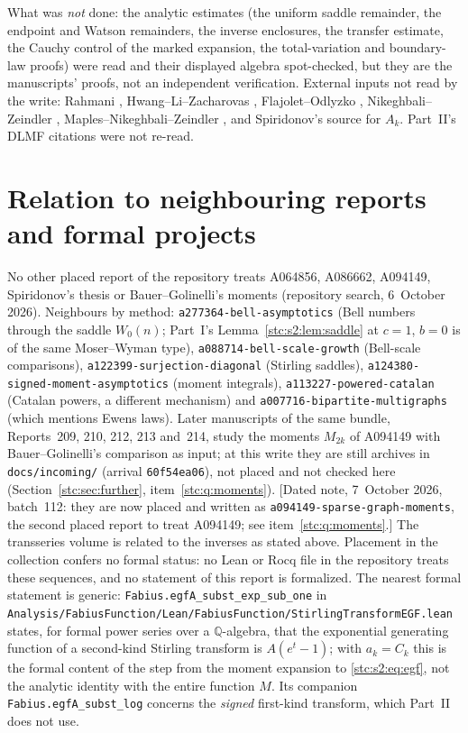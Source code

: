 \documentclass[11pt,letterpaper]{article}
\numberwithin{equation}{section}
\theoremstyle{remark}\newtheorem{remark}[theorem]{Remark}
\newcommand{\file}[1]{\nolinkurl{#1}}
\begin{document}
What was \emph{not} done: the analytic estimates (the uniform saddle remainder, the endpoint and Watson remainders, the inverse enclosures, the transfer estimate, the Cauchy control of the marked expansion, the total-variation and boundary-law proofs) were read and their displayed algebra spot-checked, but they are the manuscripts' proofs, not an independent verification. External inputs not read by the write: Rahmani \cite{rahmani}, Hwang--Li--Zacharovas \cite{hwang}, Flajolet--Odlyzko \cite{flajoletodlyzko}, Nikeghbali--Zeindler \cite{nz}, Maples--Nikeghbali--Zeindler \cite{mnz}, and Spiridonov's source for $A_k$. Part~II's DLMF citations were not re-read.

\section*{Relation to neighbouring reports and formal projects}\label{stc:sec:neighbours}
No other placed report of the repository treats A064856, A086662, A094149, Spiridonov's thesis or Bauer--Golinelli's moments (repository search, 6~October 2026). Neighbours by method: \file{a277364-bell-asymptotics} (Bell numbers through the saddle $W_0(n)$; Part~I's Lemma~\ref{stc:s2:lem:saddle} at $c=1$, $b=0$ is of the same Moser--Wyman type), \file{a088714-bell-scale-growth} (Bell-scale comparisons), \file{a122399-surjection-diagonal} (Stirling saddles), \file{a124380-signed-moment-asymptotics} (moment integrals), \file{a113227-powered-catalan} (Catalan powers, a different mechanism) and \file{a007716-bipartite-multigraphs} (which mentions Ewens laws). Later manuscripts of the same bundle, Reports~209, 210, 212, 213 and~214, study the moments $M_{2k}$ of A094149 with Bauer--Golinelli's comparison as input; at this write they are still archives in \file{docs/incoming/} (arrival \texttt{60f54ea06}), not placed and not checked here (Section~\ref{stc:sec:further}, item~\ref{stc:q:moments}). \textup{[Dated note, 7~October 2026, batch~112: they are now placed and written as \file{a094149-sparse-graph-moments}, the second placed report to treat A094149; see item~\ref{stc:q:moments}.]} The transseries volume \cite{TSvol} is related to the inverses as stated above. Placement in the collection confers no formal status: no Lean or Rocq file in the repository treats these sequences, and no statement of this report is formalized. The nearest formal statement is generic: \file{Fabius.egfA_subst_exp_sub_one} in \file{Analysis/FabiusFunction/Lean/FabiusFunction/StirlingTransformEGF.lean} states, for formal power series over a $\mathbb Q$-algebra, that the exponential generating function of a second-kind Stirling transform is $A(e^t-1)$; with $a_k=C_k$ this is the formal content of the step from the moment expansion to \eqref{stc:s2:eq:egf}, not the analytic identity with the entire function $M$. Its companion \file{Fabius.egfA_subst_log} concerns the \emph{signed} first-kind transform, which Part~II does not use.
\clearpage
\end{document}
